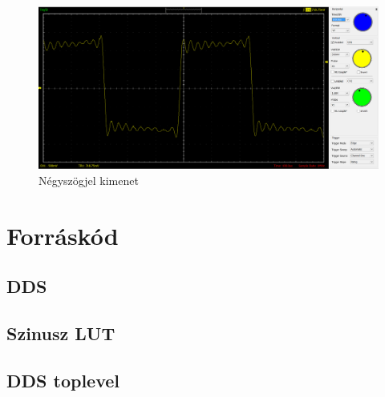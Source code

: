 \documentclass[a4paper,11pt]{article}
\begin{document}
\begin{figure}[h!]
	\begin{center}
		\includegraphics[scale=0.25]{scope_sqr.png}	
	\end{center}
	\caption{Négyszögjel kimenet}
	\label{a:sqrout}
\end{figure}

\section{Forráskód}

\subsection{DDS}



\subsection{Szinusz LUT}



\subsection{DDS toplevel}


\end{document}
